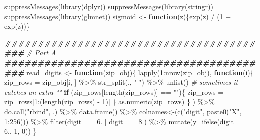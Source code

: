 \documentclass[
]{article}
\newenvironment{Shaded}{\begin{snugshade}}{\end{snugshade}}
\newcommand{\AttributeTok}[1]{\textcolor[rgb]{0.77,0.63,0.00}{#1}}
\newcommand{\CommentTok}[1]{\textcolor[rgb]{0.56,0.35,0.01}{\textit{#1}}}
\newcommand{\ControlFlowTok}[1]{\textcolor[rgb]{0.13,0.29,0.53}{\textbf{#1}}}
\newcommand{\DecValTok}[1]{\textcolor[rgb]{0.00,0.00,0.81}{#1}}
\newcommand{\DocumentationTok}[1]{\textcolor[rgb]{0.56,0.35,0.01}{\textbf{\textit{#1}}}}
\newcommand{\FloatTok}[1]{\textcolor[rgb]{0.00,0.00,0.81}{#1}}
\newcommand{\FunctionTok}[1]{\textcolor[rgb]{0.00,0.00,0.00}{#1}}
\newcommand{\NormalTok}[1]{#1}
\newcommand{\OtherTok}[1]{\textcolor[rgb]{0.56,0.35,0.01}{#1}}
\newcommand{\SpecialCharTok}[1]{\textcolor[rgb]{0.00,0.00,0.00}{#1}}
\newcommand{\StringTok}[1]{\textcolor[rgb]{0.31,0.60,0.02}{#1}}
\begin{document}
\begin{Shaded}
\begin{Highlighting}[]
\FunctionTok{suppressMessages}\NormalTok{(}\FunctionTok{library}\NormalTok{(dplyr))}
\FunctionTok{suppressMessages}\NormalTok{(}\FunctionTok{library}\NormalTok{(stringr))}
\FunctionTok{suppressMessages}\NormalTok{(}\FunctionTok{library}\NormalTok{(glmnet))}
\NormalTok{sigmoid }\OtherTok{\textless{}{-}} \ControlFlowTok{function}\NormalTok{(z)\{}\FunctionTok{exp}\NormalTok{(z) }\SpecialCharTok{/}\NormalTok{ (}\DecValTok{1} \SpecialCharTok{+} \FunctionTok{exp}\NormalTok{(z))\}}

\DocumentationTok{\#\#\#\#\#\#\#\#\#\#\#\#\#\#\#\#\#\#\#\#\#\#\#\#\#\#\#\#\#\#\#\#\#\#\#\#\#\#\#\#\#}
\CommentTok{\# Part A}
\DocumentationTok{\#\#\#\#\#\#\#\#\#\#\#\#\#\#\#\#\#\#\#\#\#\#\#\#\#\#\#\#\#\#\#\#\#\#\#\#\#\#\#\#\#}
\NormalTok{read\_digits }\OtherTok{\textless{}{-}} \ControlFlowTok{function}\NormalTok{(zip\_obj)\{}
  \FunctionTok{lapply}\NormalTok{(}\DecValTok{1}\SpecialCharTok{:}\FunctionTok{nrow}\NormalTok{(zip\_obj),  }
         \ControlFlowTok{function}\NormalTok{(i)\{}
\NormalTok{           zip\_rows }\OtherTok{=}\NormalTok{ zip\_obj[i, ] }\SpecialCharTok{\%\textgreater{}\%} 
             \FunctionTok{str\_split}\NormalTok{(., }\StringTok{" "}\NormalTok{) }\SpecialCharTok{\%\textgreater{}\%}
             \FunctionTok{unlist}\NormalTok{() }
           \CommentTok{\# sometimes it catches an extra ""}
           \ControlFlowTok{if}\NormalTok{ (zip\_rows[}\FunctionTok{length}\NormalTok{(zip\_rows)] }\SpecialCharTok{==} \StringTok{""}\NormalTok{)\{}
\NormalTok{             zip\_rows }\OtherTok{=}\NormalTok{ zip\_rows[}\DecValTok{1}\SpecialCharTok{:}\NormalTok{(}\FunctionTok{length}\NormalTok{(zip\_rows) }\SpecialCharTok{{-}} \DecValTok{1}\NormalTok{)]}
\NormalTok{           \}}
           \FunctionTok{as.numeric}\NormalTok{(zip\_rows)}
\NormalTok{         \}}
\NormalTok{  ) }\SpecialCharTok{\%\textgreater{}\%}
    \FunctionTok{do.call}\NormalTok{(}\StringTok{"rbind"}\NormalTok{, .) }\SpecialCharTok{\%\textgreater{}\%}
    \FunctionTok{data.frame}\NormalTok{() }\SpecialCharTok{\%\textgreater{}\%}
    \StringTok{\textasciigrave{}}\AttributeTok{colnames\textless{}{-}}\StringTok{\textasciigrave{}}\NormalTok{(}\FunctionTok{c}\NormalTok{(}\StringTok{"digit"}\NormalTok{, }\FunctionTok{paste0}\NormalTok{(}\StringTok{"X"}\NormalTok{, }\DecValTok{1}\SpecialCharTok{:}\DecValTok{256}\NormalTok{))) }\SpecialCharTok{\%\textgreater{}\%}
    \FunctionTok{filter}\NormalTok{(digit }\SpecialCharTok{==} \FloatTok{6.} \SpecialCharTok{|}\NormalTok{ digit }\SpecialCharTok{==} \FloatTok{8.}\NormalTok{) }\SpecialCharTok{\%\textgreater{}\%}
    \FunctionTok{mutate}\NormalTok{(}\AttributeTok{y=}\FunctionTok{ifelse}\NormalTok{(digit }\SpecialCharTok{==} \FloatTok{6.}\NormalTok{, }\DecValTok{1}\NormalTok{, }\DecValTok{0}\NormalTok{))}
\NormalTok{\}}


\end{Highlighting}
\end{Shaded}
\end{document}
